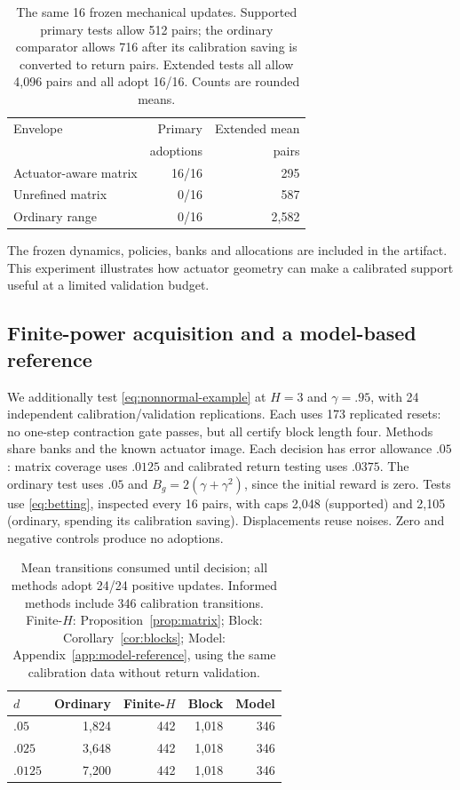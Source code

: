 \documentclass[twocolumn,nameyear]{autart}
\begin{document}
\begin{table}[t]
\centering
\begin{tabular}{@{}lrr@{}}
\toprule
Envelope & Primary & Extended mean\\
 & adoptions & pairs\\
\midrule
Actuator-aware matrix & 16/16 & 295\\
Unrefined matrix & 0/16 & 587\\
Ordinary range & 0/16 & 2,582\\
\bottomrule
\end{tabular}
\caption{The same 16 frozen mechanical updates. Supported primary
tests allow 512 pairs; the ordinary comparator allows 716 after its
calibration saving is converted to return pairs. Extended tests all
allow 4,096 pairs and all adopt 16/16. Counts are rounded means.}
\label{tab:mechanical}
\end{table}

The frozen dynamics, policies, banks and allocations are included in the artifact. This experiment
illustrates how actuator geometry can make a calibrated support useful
at a limited validation budget.

\subsection{Finite-power acquisition and a model-based reference}\label{sec:block-study}
We additionally test \eqref{eq:nonnormal-example} at $H=3$ and
$\gamma=.95$, with 24 independent calibration/validation replications.
Each uses 173 replicated resets: no one-step contraction gate passes,
but all certify block length four. Methods share banks and the known
actuator image. Each decision has error allowance $.05$:
matrix coverage uses $.0125$ and calibrated return testing uses $.0375$.
The ordinary test uses $.05$ and $B_g=2(\gamma+\gamma^2)$, since
the initial reward is zero. Tests use \eqref{eq:betting}, inspected every
16 pairs, with caps 2,048 (supported) and 2,105 (ordinary, spending its
calibration saving). Displacements reuse noises. Zero and negative
controls produce no adoptions.

\begin{table}[t]
\centering\small
\begin{tabular}{@{}lrrrr@{}}
\toprule
$d$ & Ordinary & Finite-$H$ & Block & Model\\
\midrule
$.05$ & 1,824 & 442 & 1,018 & 346\\
$.025$ & 3,648 & 442 & 1,018 & 346\\
$.0125$ & 7,200 & 442 & 1,018 & 346\\
\bottomrule
\end{tabular}
\caption{Mean transitions consumed until decision; all methods
adopt 24/24 positive updates. Informed methods include 346 calibration
transitions. Finite-$H$: Proposition~\ref{prop:matrix}; Block:
Corollary~\ref{cor:blocks}; Model: Appendix~\ref{app:model-reference},
using the same calibration data without return validation.}
\label{tab:block-study}
\end{table}
\end{document}
